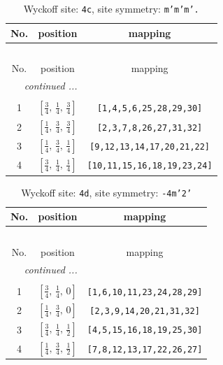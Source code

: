 \documentclass[fleqn,8pt]{jsarticle}
\begin{document}
\renewcommand{\arraystretch}{1.2}
\begin{longtable}{ccc}
\caption{Wyckoff site: {\tt 4c}, site symmetry: {\tt m'm'm'.}}
 \\
 \hline \hline
No. & position & mapping \\ \hline \endfirsthead

\multicolumn{2}{l}{\tablename\ \thetable{}} \\
 \hline \hline
No. & position & mapping \\ \hline \endhead

 \hline \hline
\multicolumn{2}{r}{\footnotesize\it continued ...} \\ \endfoot

 \hline \hline
\multicolumn{2}{r}{} \\ \endlastfoot

1 & $\left[ \frac{3}{4},\, \frac{1}{4},\, \frac{3}{4} \right]$ & {\tt [1,4,5,6,25,28,29,30]} \\ \hline
2 & $\left[ \frac{1}{4},\, \frac{3}{4},\, \frac{3}{4} \right]$ & {\tt [2,3,7,8,26,27,31,32]} \\ \hline
3 & $\left[ \frac{1}{4},\, \frac{3}{4},\, \frac{1}{4} \right]$ & {\tt [9,12,13,14,17,20,21,22]} \\ \hline
4 & $\left[ \frac{3}{4},\, \frac{1}{4},\, \frac{1}{4} \right]$ & {\tt [10,11,15,16,18,19,23,24]} \\
\end{longtable}
\renewcommand{\arraystretch}{1.2}
\begin{longtable}{ccc}
\caption{Wyckoff site: {\tt 4d}, site symmetry: {\tt -4m'2'}}
 \\
 \hline \hline
No. & position & mapping \\ \hline \endfirsthead

\multicolumn{2}{l}{\tablename\ \thetable{}} \\
 \hline \hline
No. & position & mapping \\ \hline \endhead

 \hline \hline
\multicolumn{2}{r}{\footnotesize\it continued ...} \\ \endfoot

 \hline \hline
\multicolumn{2}{r}{} \\ \endlastfoot

1 & $\left[ \frac{3}{4},\, \frac{1}{4},\, 0 \right]$ & {\tt [1,6,10,11,23,24,28,29]} \\ \hline
2 & $\left[ \frac{1}{4},\, \frac{3}{4},\, 0 \right]$ & {\tt [2,3,9,14,20,21,31,32]} \\ \hline
3 & $\left[ \frac{3}{4},\, \frac{1}{4},\, \frac{1}{2} \right]$ & {\tt [4,5,15,16,18,19,25,30]} \\ \hline
4 & $\left[ \frac{1}{4},\, \frac{3}{4},\, \frac{1}{2} \right]$ & {\tt [7,8,12,13,17,22,26,27]} \\
\end{longtable}
\end{document}
